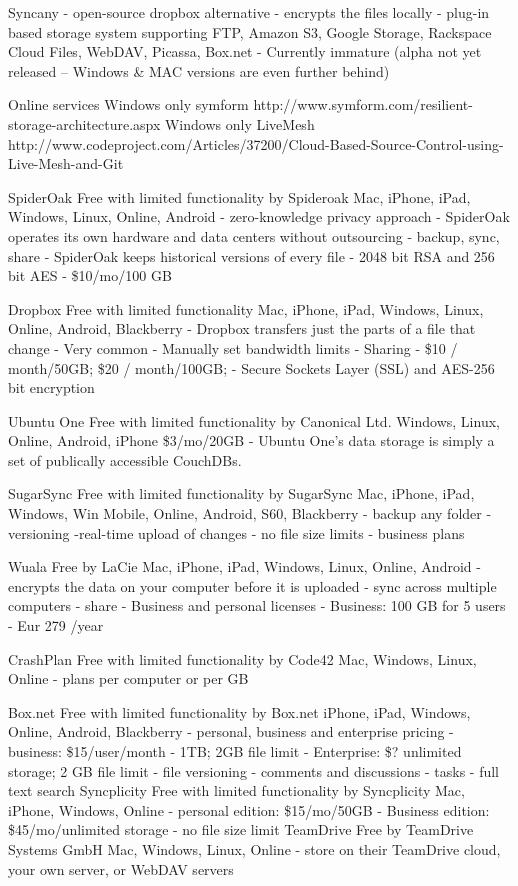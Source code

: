 			Syncany
				- open-source dropbox alternative
				- encrypts the files locally
				- plug-in based storage system supporting FTP, Amazon S3, Google Storage, Rackspace Cloud Files, WebDAV, Picassa, Box.net
				- Currently immature (alpha not yet released -- Windows \& MAC versions are even further behind)
		
		
		Online services
			Windows only
				symform
				http://www.symform.com/resilient-storage-architecture.aspx
					Windows only
				LiveMesh 
					http://www.codeproject.com/Articles/37200/Cloud-Based-Source-Control-using-Live-Mesh-and-Git
			
			SpiderOak
				Free with limited functionality by Spideroak
				Mac, iPhone, iPad, Windows, Linux, Online, Android
				- zero-knowledge privacy approach 
				- SpiderOak operates its own hardware and data centers without outsourcing
				- backup, sync, share
				- SpiderOak keeps historical versions of every file
				- 2048 bit RSA and 256 bit AES
				- \$10/mo/100 GB
				
			Dropbox
				Free with limited functionality 
				Mac, iPhone, iPad, Windows, Linux, Online, Android, Blackberry
				- Dropbox transfers just the parts of a file that change
				- Very common
				- Manually set bandwidth limits
				- Sharing
				- \$10 / month/50GB; \$20 / month/100GB; 
				- Secure Sockets Layer (SSL) and AES-256 bit encryption
				
			Ubuntu One
				Free with limited functionality by Canonical Ltd. 
				Windows, Linux, Online, Android, iPhone
				\$3/mo/20GB
				- Ubuntu One's data storage is simply a set of publically accessible CouchDBs.
				
			SugarSync
				Free with limited functionality by SugarSync 
				Mac, iPhone, iPad, Windows, Win Mobile, Online, Android, S60, Blackberry
				- backup any folder
				- versioning
				-real-time upload of changes
				- no file size limits
				- business plans
				
			Wuala
				Free by LaCie 
				Mac, iPhone, iPad, Windows, Linux, Online, Android
				- encrypts the data on your computer before it is uploaded
				- sync across multiple computers
				- share
				- Business and personal licenses
					- Business: 100 GB for 5 users - Eur 279 /year
					
			CrashPlan
				Free with limited functionality by Code42 
				Mac, Windows, Linux, Online
				- plans per computer or per GB
				
			Box.net
				Free with limited functionality by Box.net
				iPhone, iPad, Windows, Online, Android, Blackberry
				- personal, business and enterprise pricing
					- business: \$15/user/month - 1TB; 2GB file limit
					- Enterprise: \$? unlimited storage; 2 GB file limit
				- file versioning
				- comments and discussions
				- tasks
				- full text search
			Syncplicity
				Free with limited functionality by Syncplicity
				Mac, iPhone, Windows, Online
				- personal edition: \$15/mo/50GB
				- Business edition: \$45/mo/unlimited storage
				- no file size limit
			TeamDrive
				Free by TeamDrive Systems GmbH 
				Mac, Windows, Linux, Online
				- store on their TeamDrive cloud, your own server, or WebDAV servers
				

